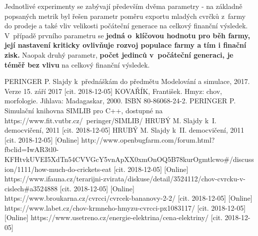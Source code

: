 \documentclass[11pt, a4paper, titlepage]{article}
\begin{document}
    Jednotlivé experimenty se zabývají především dvěma parametry - na základně popsaných metrik byl řešen parametr poměru
    exportu mladých cvrčků z~farmy do prodeje a také vliv velikosti počáteční generace na celkový finanční výsledek. V~případě
    prvního parametru se \textbf{jedná o~klíčovou hodnotu pro běh farmy, její nastavení kriticky ovlivňuje rozvoj populace farmy
    a tím i finační zisk.} Naopak druhý parametr, \textbf{počet jedinců v~počáteční generaci, je téměř bez vlivu} na celkový
    finanční výsledek.

    \begin{thebibliography}{zdroje}
         \label{ims} PERINGER P. Slajdy k~přednáškám do předmětu Modelování a simulace, 2017. Verze 15. září 2017 [cit. 2018-12-05]
         \label{kniha} KOVAŘÍK, František. Hmyz: chov, morfologie. Jihlava: Madagaskar, 2000. ISBN 80-86068-24-2.
         \label{simlib} PERINGER P. Simulační knihovna SIMLIB pro C++, dostupné na https://www.fit.vutbr.cz/~peringer/SIMLIB/
         \label{prvnidemo} HRUBÝ M. Slajdy k~I. democvičení, 2011 [cit. 2018-12-05]
         \label{druhedemo} HRUBÝ M. Slajdy k~II. democvičení, 2011 [cit. 2018-12-05]
         \label{jidlo} [Online] http://www.openbugfarm.com/forum.html?fbclid=IwAR3tl0-KFHtvkUVEI5XdTn54CVVGcY5vnApXX0xmOnOQ5B78kurOgmtlcwo\#/discussion/1111/how-much-do-crickets-eat [cit. 2018-12-05]
         \label{forum} [Online] https://www.ifauna.cz/terarijni-zvirata/diskuse/detail/3524112/chov-cvrcku-v-cislech\#a3524888 [cit. 2018-12-05]
         \label{cena} [Online] https://www.broukarna.cz/cvrcci/cvrcek-bananovy-2-2/ [cit. 2018-12-05]
         \label{topeni} [Online] https://www.labet.cz/chov-krmneho-hmyzu-cvrcci-px1083117/ [cit. 2018-12-05]
         \label{cena_topeni} [Online] https://www.usetreno.cz/energie-elektrina/cena-elektriny/ [cit. 2018-12-05]
    \end{thebibliography}
\end{document}
